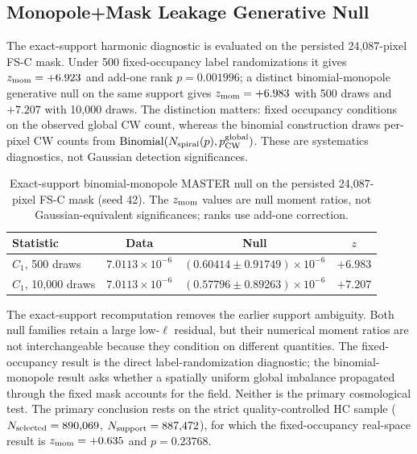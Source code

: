 \documentclass[twocolumn,linenumbers]{aastex702}
\newcommand{\FSC}{\textsc{FS-C}}
\begin{document}
\subsection{Monopole+Mask Leakage Generative Null}
\label{sec:monopole_mask_null}

The exact-support harmonic diagnostic is evaluated on the persisted 24,087-pixel \FSC{} mask. Under 500 fixed-occupancy label randomizations it gives $z_{\rm mom}=+6.923$ and add-one rank $p=0.001996$; a distinct binomial-monopole generative null on the same support gives $z_{\rm mom}=+6.983$ with 500 draws and $+7.207$ with 10,000 draws. The distinction matters: fixed occupancy conditions on the observed global CW count, whereas the binomial construction draws per-pixel CW counts from $\mathrm{Binomial}(N_{\rm spiral}(p),p_{\rm CW}^{\rm global})$. These are systematics diagnostics, not Gaussian detection significances.

\begin{table}[tbp]
\caption{Exact-support binomial-monopole MASTER null on the persisted 24,087-pixel \FSC{} mask (seed 42). The $z_{\rm mom}$ values are null moment ratios, not Gaussian-equivalent significances; ranks use add-one correction.\label{tab:monopole_mask_null}}
\begin{tabular}{lccc}
\textbf{Statistic} & \textbf{Data} & \textbf{Null} & \textbf{$z$} \\
\hline
$C_1$, 500 draws & $7.0113{\times}10^{-6}$ & $(0.60414{\pm}0.91749){\times}10^{-6}$ & $+6.983$ \\
$C_1$, 10,000 draws & $7.0113{\times}10^{-6}$ & $(0.57796{\pm}0.89263){\times}10^{-6}$ & $+7.207$ \\
\end{tabular}
\end{table}

The exact-support recomputation removes the earlier support ambiguity. Both null families retain a large low-$\ell$ residual, but their numerical moment ratios are not interchangeable because they condition on different quantities. The fixed-occupancy result is the direct label-randomization diagnostic; the binomial-monopole result asks whether a spatially uniform global imbalance propagated through the fixed mask accounts for the field. Neither is the primary cosmological test. The primary conclusion rests on the strict quality-controlled HC sample ($N_{\rm selected}=890{,}069$, $N_{\rm support}=887{,}472$), for which the fixed-occupancy real-space result is $z_{\rm mom}=+0.635$ and $p=0.23768$.
\end{document}
